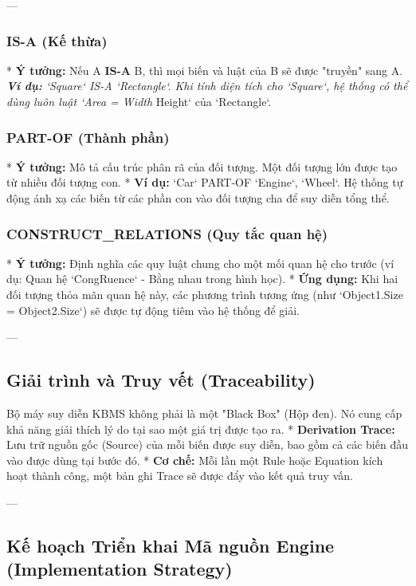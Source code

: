 ---

\subsubsection{IS-A (Kế thừa)}
*   \textbf{Ý tưởng:} Nếu A \textbf{IS-A} B, thì mọi biến và luật của B sẽ được "truyền" sang A.
\textit{   \textbf{Ví dụ:} `Square` IS-A `Rectangle`. Khi tính diện tích cho `Square`, hệ thống có thể dùng luôn luật `Area = Width } Height` của `Rectangle`.

\subsubsection{PART-OF (Thành phần)}
*   \textbf{Ý tưởng:} Mô tả cấu trúc phân rã của đối tượng. Một đối tượng lớn được tạo từ nhiều đối tượng con.
*   \textbf{Ví dụ:} `Car` PART-OF `Engine`, `Wheel`. Hệ thống tự động ánh xạ các biến từ các phần con vào đối tượng cha để suy diễn tổng thể.

\subsubsection{CONSTRUCT_RELATIONS (Quy tắc quan hệ)}
*   \textbf{Ý tưởng:} Định nghĩa các quy luật chung cho một mối quan hệ cho trước (ví dụ: Quan hệ `CongRuence` - Bằng nhau trong hình học).
*   \textbf{Ứng dụng:} Khi hai đối tượng thỏa mãn quan hệ này, các phương trình tương ứng (như `Object1.Size = Object2.Size`) sẽ được tự động tiêm vào hệ thống để giải.

---

\subsection{Giải trình và Truy vết (Traceability)}

Bộ máy suy diễn KBMS không phải là một "Black Box" (Hộp đen). Nó cung cấp khả năng giải thích lý do tại sao một giá trị được tạo ra.
*   \textbf{Derivation Trace:} Lưu trữ nguồn gốc (Source) của mỗi biến được suy diễn, bao gồm cả các biến đầu vào được dùng tại bước đó.
*   \textbf{Cơ chế:} Mỗi lần một Rule hoặc Equation kích hoạt thành công, một bản ghi Trace sẽ được đẩy vào kết quả truy vấn.

---

\subsection{Kế hoạch Triển khai Mã nguồn Engine (Implementation Strategy)}

